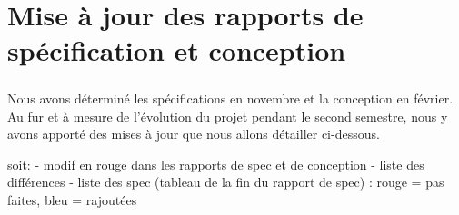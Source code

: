 \chapter{Mise à jour des rapports de spécification et conception}

\paragraph{}
Nous avons déterminé les spécifications en novembre et la conception en février. Au fur et à mesure de l'évolution du projet pendant le second semestre, nous y avons apporté des mises à jour que nous allons détailler ci-dessous.

soit:
- modif en rouge dans les rapports de spec et de conception
- liste des différences
- liste des spec (tableau de la fin du rapport de spec) : rouge = pas faites, bleu = rajoutées